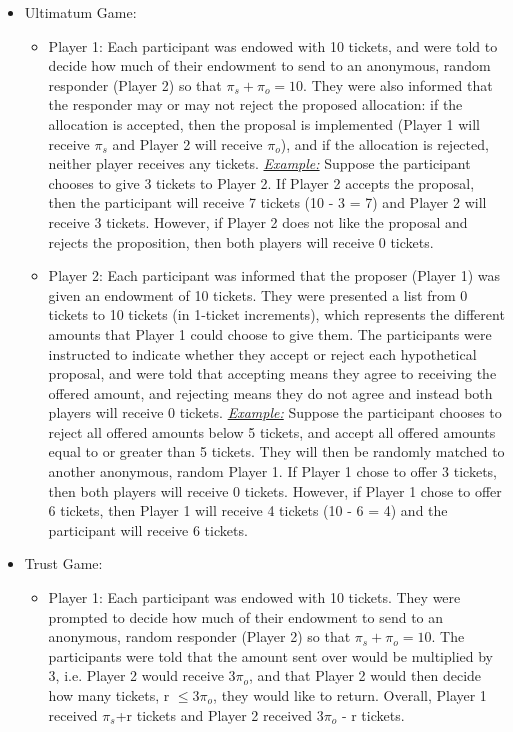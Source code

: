 \documentclass[12pt]{article}
\begin{document}
\begin{itemize}
\item{Ultimatum Game}: 
	\begin{itemize}
		\item{Player 1}: Each participant was endowed with 10 tickets, and were told to decide how much of their endowment to send to an anonymous, random responder (Player 2) so that \(\pi_{s} + \pi_{o} = 10\). They were also informed that the responder may or may not reject the proposed allocation: if the allocation is accepted, then the proposal is implemented (Player 1 will receive \(\pi_{s}\) and Player 2 will receive \(\pi_{o}\)), and if the allocation is rejected, neither player receives any tickets.
		\subitem \underline{\textit{Example:}} Suppose the participant chooses to give 3 tickets to Player 2. If Player 2 accepts the proposal, then the participant will receive 7 tickets (10 - 3 = 7) and Player 2 will receive 3 tickets. However, if Player 2 does not like the proposal and rejects the proposition, then both players will receive 0 tickets.
		\item{Player 2}: Each participant was informed that the proposer (Player 1) was given an endowment of 10 tickets. They were presented a list from 0 tickets to 10 tickets (in 1-ticket increments), which represents the different amounts that Player 1 could choose to give them. The participants were instructed to indicate whether they accept or reject each hypothetical proposal, and were told that accepting means they agree to receiving the offered amount, and rejecting means they do not agree and instead both players will receive 0 tickets.
		\subitem \underline{\textit{Example:}} Suppose the participant chooses to reject all offered amounts below 5 tickets, and accept all offered amounts equal to or greater than 5 tickets. They will then be randomly matched to another anonymous, random Player 1. If Player 1 chose to offer 3 tickets, then both players will receive 0 tickets. However, if Player 1 chose to offer 6 tickets, then Player 1 will receive 4 tickets (10 - 6 = 4) and the participant will receive 6 tickets.
	\end{itemize}
\item{Trust Game}:
	\begin{itemize}
		\item{Player 1}: Each participant was endowed with 10 tickets. They were prompted to decide how much of their endowment to send to an anonymous, random responder (Player 2) so that \(\pi_{s} + \pi_{o} = 10\). The participants were told that the amount sent over would be multiplied by 3, i.e. Player 2 would receive 3\(\pi_{o}\), and that Player 2 would then decide how many tickets, r \(\leq 3\pi_{o}\), they would like to return. Overall, Player 1 received \(\pi_{s}\)+r tickets and Player 2 received 3\(\pi_{o}\) - r tickets.

\end{itemize}
\end{itemize}
\end{document}
